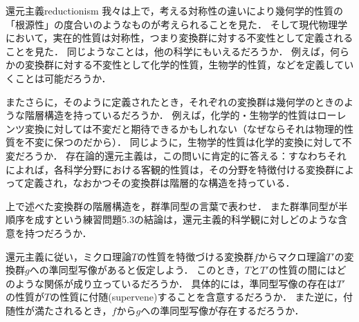\documentclass[11pt,a4paper]{jsarticle}
\begin{document}
\begin{rei}{還元主義}{reductionism}
我々は上で，考える対称性の違いにより幾何学的性質の「根源性」の度合いのようなものが考えられることを見た．
そして現代物理学において，実在的性質は対称性，つまり変換群に対する不変性として定義されることを見た．
同じようなことは，他の科学にもいえるだろうか．
例えば，何らかの変換群に対する不変性として化学的性質，生物学的性質，などを定義していくことは可能だろうか．

またさらに，そのように定義されたとき，それぞれの変換群は幾何学のときのような階層構造を持っているだろうか．
例えば，化学的・生物学的性質はローレンツ変換に対しては不変だと期待できるかもしれない（なぜならそれは物理的性質を不変に保つのだから）．
同じように，生物学的性質は化学的変換に対して不変だろうか．
存在論的還元主義は，この問いに肯定的に答える：すなわちそれによれば，各科学分野における客観的性質は，その分野を特徴付ける変換群によって定義され，なおかつその変換群は階層的な構造を持っている．
\end{rei}

\begin{renshu}{}{}
上で述べた変換群の階層構造を，群準同型の言葉で表わせ．
また群準同型が半順序を成すという練習問題5.3の結論は，還元主義的科学観に対しどのような含意を持つだろうか．
\end{renshu}

\begin{renshu}{}{}
還元主義に従い，ミクロ理論$T$の性質を特徴づける変換群$f$からマクロ理論$T'$の変換群$g$への準同型写像があると仮定しよう．
このとき，$T$と$T'$の性質の間にはどのような関係が成り立っているだろうか．
具体的には，準同型写像の存在は$T'$の性質が$T$の性質に付随(supervene)することを含意するだろうか．
また逆に，付随性が満たされるとき，$f$から$g$への準同型写像が存在するだろうか．
\end{renshu}




\end{document}
